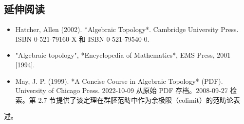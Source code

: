 \subsection{延伸阅读}
\begin{itemize}
\item Hatcher, Allen (2002). *Algebraic Topology*. Cambridge University Press. ISBN 0-521-79160-X 和 ISBN 0-521-79540-0.
\item "Algebraic topology", *Encyclopedia of Mathematics*, EMS Press, 2001 [1994].
\item May, J. P. (1999). *A Concise Course in Algebraic Topology* (PDF). University of Chicago Press. 2022-10-09 从原始 PDF 存档。2008-09-27 检索。第 2.7 节提供了该定理在群胚范畴中作为余极限（colimit）的范畴论表
\end{itemize}述。
